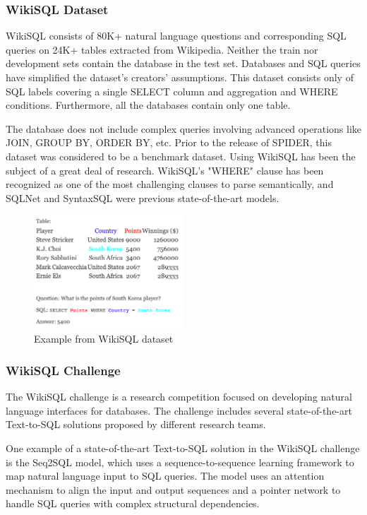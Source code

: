 \subsubsection{WikiSQL Dataset}

WikiSQL consists of 80K+ natural language questions and corresponding SQL queries on 24K+ tables extracted from Wikipedia. Neither the train nor development sets contain the database in the test set. Databases and SQL queries have simplified the dataset's creators' assumptions. This dataset consists only of SQL labels covering a single SELECT column and aggregation and WHERE conditions. Furthermore, all the databases contain only one table.

The database does not include complex queries involving advanced operations like JOIN, GROUP BY, ORDER BY, etc. Prior to the release of SPIDER, this dataset was considered to be a benchmark dataset. Using WikiSQL has been the subject of a great deal of research. WikiSQL's "WHERE" clause has been recognized as one of the most challenging clauses to parse semantically, and SQLNet and SyntaxSQL were previous state-of-the-art models.


\begin{figure}[htb]
    \centering
    \includegraphics[width=0.5\textwidth]{pics/db/WikiSQL.png}
    \caption{Example from WikiSQL dataset\cite{hwang_comprehensive_2019}}
    \label{fig:WikiSQL}
\end{figure}

\subsubsection{WikiSQL Challenge}

The WikiSQL challenge is a research competition focused on developing natural language interfaces for databases. The challenge includes several state-of-the-art Text-to-SQL solutions proposed by different research teams.

One example of a state-of-the-art Text-to-SQL solution in the WikiSQL challenge is the Seq2SQL model, which uses a sequence-to-sequence learning framework to map natural language input to SQL queries. The model uses an attention mechanism to align the input and output sequences and a pointer network to handle SQL queries with complex structural dependencies.

